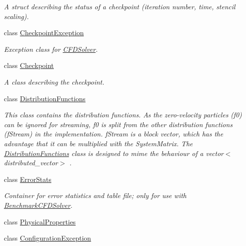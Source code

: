 \begin{DoxyCompactItemize}
\begin{DoxyCompactList}\small\item\em A struct describing the status of a checkpoint (iteration number, time, stencil scaling). \item\end{DoxyCompactList}\item 
class \hyperlink{classnatrium_1_1CheckpointException}{CheckpointException}
\begin{DoxyCompactList}\small\item\em Exception class for \hyperlink{classnatrium_1_1CFDSolver}{CFDSolver}. \item\end{DoxyCompactList}\item 
class \hyperlink{classnatrium_1_1Checkpoint}{Checkpoint}
\begin{DoxyCompactList}\small\item\em A class describing the checkpoint. \item\end{DoxyCompactList}\item 
class \hyperlink{classnatrium_1_1DistributionFunctions}{DistributionFunctions}
\begin{DoxyCompactList}\small\item\em This class contains the distribution functions. As the zero-\/velocity particles (f0) can be ignored for streaming, f0 is split from the other distribution functions (fStream) in the implementation. fStream is a block vector, which has the advantage that it can be multiplied with the SystemMatrix. The \hyperlink{classnatrium_1_1DistributionFunctions}{DistributionFunctions} class is designed to mime the behaviour of a vector$<$distributed\_\-vector$>$ . \item\end{DoxyCompactList}\item 
class \hyperlink{classnatrium_1_1ErrorStats}{ErrorStats}
\begin{DoxyCompactList}\small\item\em Container for error statistics and table file; only for use with \hyperlink{classnatrium_1_1BenchmarkCFDSolver}{BenchmarkCFDSolver}. \item\end{DoxyCompactList}\item 
class \hyperlink{classnatrium_1_1PhysicalProperties}{PhysicalProperties}
\item 
class \hyperlink{classnatrium_1_1ConfigurationException}{ConfigurationException}

\end{DoxyCompactItemize}
